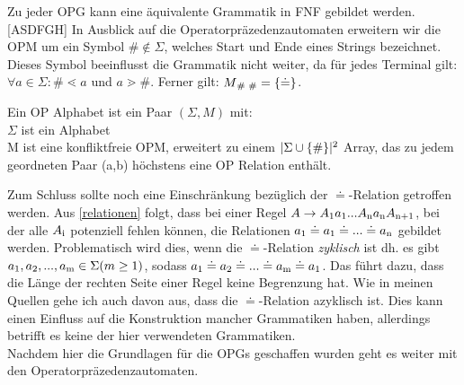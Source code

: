 Zu jeder OPG kann eine äquivalente Grammatik in FNF gebildet werden. [ASDFGH]
In Ausblick auf die Operatorpräzedenzautomaten erweitern wir die OPM um ein Symbol $\# \notin \Sigma$, welches Start und Ende eines Strings bezeichnet. Dieses Symbol beeinflusst die Grammatik nicht weiter, da für jedes Terminal gilt: $\forall a \in \Sigma: \# \lessdot a $ und $a \gtrdot \#$. Ferner gilt: $M\textsubscript{\# \#}=\{ \doteq \}$.
\begin{definition}
Ein OP Alphabet ist ein Paar $(\Sigma, M)$ mit:\\
$\Sigma$ ist ein Alphabet \\
M ist eine konfliktfreie OPM, erweitert zu einem $ |\Sigma \cup \{\#\}|\textsuperscript{2}$ Array, das zu jedem geordneten Paar (a,b) höchstens eine OP Relation enthält.
\end{definition} 
Zum Schluss sollte noch eine Einschränkung bezüglich der $\doteq$-Relation getroffen werden. Aus \autoref{relationen} folgt, dass bei einer Regel $A \rightarrow  A \textsubscript{1} a \textsubscript{1}... A \textsubscript{n} a \textsubscript{n} A \textsubscript{n+1}$, bei der alle $A \textsubscript{i}$ potenziell fehlen können, die Relationen $a\textsubscript{1} \doteq a \textsubscript{1} \doteq ... \doteq a \textsubscript{n}$ gebildet werden. Problematisch wird dies, wenn die $\doteq$-Relation \textit{zyklisch} ist dh. es gibt $a\textsubscript{1}, a\textsubscript{2}, ..., a \textsubscript{m} \in \Sigma (m \geq  1)$, sodass $a\textsubscript{1} \doteq a \textsubscript{2} \doteq ... \doteq a \textsubscript{m} \doteq a \textsubscript{1}$. Das führt dazu, dass die Länge der rechten Seite einer Regel keine Begrenzung hat. Wie in meinen Quellen gehe ich auch davon aus, dass die $\doteq$-Relation azyklisch ist. Dies kann einen Einfluss auf die Konstruktion mancher Grammatiken haben, allerdings betrifft es keine der hier verwendeten Grammatiken.\\
Nachdem hier die Grundlagen für die OPGs geschaffen wurden geht es weiter mit den Operatorpräzedenzautomaten.

